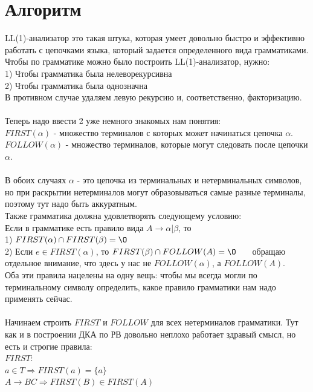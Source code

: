 \documentclass[14pt]{extreport}
\begin{document}
	\section{Алгоритм}
	LL(1)-анализатор это такая штука, которая умеет довольно быстро и эффективно работать
	с цепочками языка, который задается определенного вида грамматиками.\\
	Чтобы по грамматике можно было построить LL(1)-анализатор, нужно:\\
	1) Чтобы грамматика была нелеворекурсивна\\
	2) Чтобы грамматика была однозначна\\
	В противном случае удаляем левую рекурсию и, соответственно, факторизацию.\\\\
	Теперь надо ввести 2 уже немного знакомых нам понятия:\\
	$FIRST(\alpha)$ - множество терминалов с которых может начинаться
	цепочка $\alpha$.\\
	$FOLLOW(\alpha)$ - множество терминалов, которые могут следовать после
	цепочки $\alpha$.\\\\
	В обоих случаях $\alpha$ - это цепочка из терминальных и нетерминальных символов,
	но при раскрытии нетерминалов могут образовываться самые разные терминалы, поэтому
	тут надо быть аккуратным.\\
	Также грамматика должна удовлетворять следующему условию:\\
	Если в грамматике есть правило вида $A \to \alpha|\beta $, то\\
	1) $FIRST(\alpha) \cap FIRST(\beta) = \O$\\
	2) Если $e \in FIRST(\alpha)$, то $FIRST(\beta) \cap FOLLOW(A) = \O$
	\ \ \ обращаю отдельное внимание, что здесь у нас не  $FOLLOW(\alpha)$,
	а $FOLLOW(A)$.\\
	\newpage
	Оба эти правила нацелены на одну вещь: чтобы мы всегда могли по терминальному символу
	определить, какое правило грамматики нам надо применять сейчас.\\\\
	Начинаем строить $FIRST$ и $FOLLOW$ для всех нетерминалов грамматики. Тут как и в
	построении ДКА по РВ довольно неплохо работает здравый смысл, но есть и строгие правила:\\
	$FIRST$:\\
	\hspace*{30pt} $a \in T \Rightarrow FIRST(a)=\{a\}$\\
	\hspace*{30pt} $A \to BC \Rightarrow FIRST(B) \in FIRST(A)$\\
\end{document}
